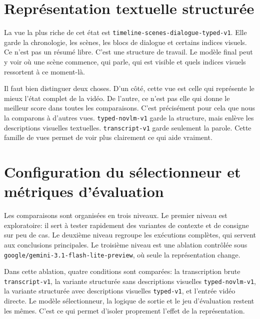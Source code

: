 \section{Repr\'esentation textuelle structur\'ee}




La vue la plus riche de cet \'etat est \texttt{timeline-scenes-dialogue-typed-v1}. Elle garde la chronologie, les sc\`enes, les blocs de dialogue et certains indices visuels. Ce n'est pas un r\'esum\'e libre. C'est une structure de travail. Le mod\`ele final peut y voir o\`u une sc\`ene commence, qui parle, qui est visible et quels indices visuels ressortent \`a ce moment-l\`a.

Il faut bien distinguer deux choses. D'un c\^ot\'e, cette vue est celle qui repr\'esente le mieux l'\'etat complet de la vid\'eo. De l'autre, ce n'est pas elle qui donne le meilleur score dans toutes les comparaisons. C'est pr\'ecis\'ement pour cela que nous la comparons \`a d'autres vues. \texttt{typed-novlm-v1} garde la structure, mais enl\`eve les descriptions visuelles textuelles. \texttt{transcript-v1} garde seulement la parole. Cette famille de vues permet de voir plus clairement ce qui aide vraiment.

\section{Configuration du s\'electionneur et m\'etriques d'\'evaluation}

Les comparaisons sont organis\'ees en trois niveaux. Le premier niveau est exploratoire: il sert \`a tester rapidement des variantes de contexte et de consigne sur peu de cas. Le deuxi\`eme niveau regroupe les ex\'ecutions compl\`etes, qui servent aux conclusions principales. Le troisi\`eme niveau est une ablation contr\^ol\'ee sous \texttt{google/gemini-3.1-flash-lite-preview}, o\`u seule la repr\'esentation change.

Dans cette ablation, quatre conditions sont compar\'ees: la transcription brute \texttt{transcript-v1}, la variante structur\'ee sans descriptions visuelles \texttt{typed-novlm-v1}, la variante structur\'ee avec descriptions visuelles \texttt{typed-v1}, et l'entr\'ee vid\'eo directe. Le mod\`ele s\'electionneur, la logique de sortie et le jeu d'\'evaluation restent les m\^emes. C'est ce qui permet d'isoler proprement l'effet de la repr\'esentation.

